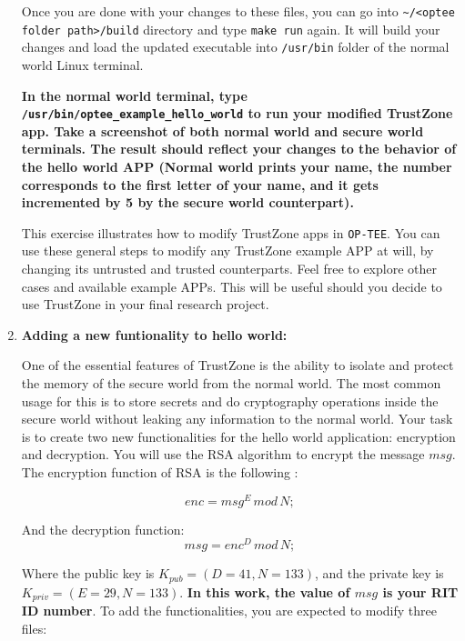 \documentclass[10pt]{article}
\begin{document}
\begin{enumerate}
\begin{itemize}
\end{itemize} 

Once you are done with your changes to these files, you can go into \verb|~/<optee folder path>/build| directory and type \verb|make run| again.
It will build your changes and load the updated executable into \verb|/usr/bin| folder of the normal world Linux terminal.

{\bf \color{red} In the normal world terminal, type \verb|/usr/bin/optee_example_hello_world| to run your modified TrustZone app. Take a screenshot of both normal world and secure world terminals. The result should reflect your changes to the behavior of the hello world APP (Normal world prints your name, the number corresponds to the first letter of your name, and it gets incremented by 5 by the secure world counterpart).}


This exercise illustrates how to modify TrustZone apps in \verb|OP-TEE|. You can use these general steps to modify any TrustZone example APP at will, by changing its untrusted and trusted counterparts. Feel free to explore other cases and available example APPs. This will be useful should you decide to use TrustZone in your final research project.



\item {\bf Adding a new funtionality to hello world:}

One of the essential features of TrustZone is the ability to isolate and protect the memory of the secure world from the normal world. The most common usage for this is to store secrets and do cryptography operations inside the secure world without leaking any information to the normal world. Your task is to create two new functionalities for the hello world application: encryption and decryption. You will use the RSA algorithm to encrypt the message $msg$. The encryption function of RSA is the following :

\begin{equation}
	enc = msg^E\, mod \, N;
\end{equation}

And the decryption function:
\begin{equation}
	msg = enc^D \, mod \, N;
\end{equation}

Where the public key is $K_{pub}=(D=41, N=133)$, and the private key is $K_{priv}=(E=29, N=133)$. \textbf{In this work, the value of $msg$ is your RIT ID number}. To add the functionalities, you are expected to modify three files:


\end{enumerate}
\end{document}
